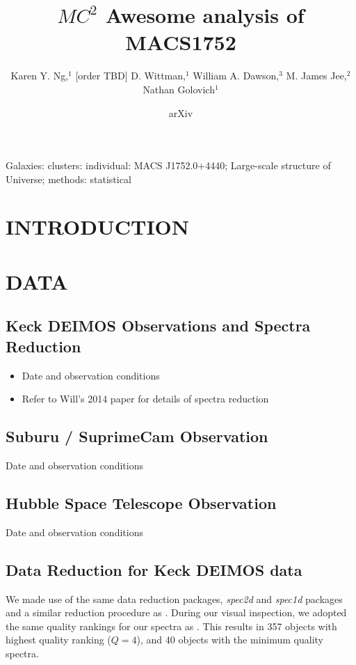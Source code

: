 \documentclass[letterpaper,useAMS,usenatbib]{mn2e}
\title[
	$MC^2$ Awesome analysis of MACS1752 
]
{$MC^2$ Awesome analysis of MACS1752}
\author[Karen Y. Ng et al.]{Karen Y. Ng,$^{1}$
	[order TBD]
	D. Wittman,$^{1}$
	William A. Dawson,$^{3}$ 
	M. James Jee,$^{2}$
	\newauthor Nathan Golovich$^{1}$
}
\begin{document}
\date{arXiv} \pagerange{\pageref{firstpage}--\pageref{lastpage}}
 \maketitle\label{firstpage}
\begin{abstract} 
	
\end{abstract}
\begin{keywords}
Galaxies: clusters: individual: MACS J1752.0+4440; Large-scale structure of
Universe; methods: statistical 
\end{keywords}
\section{INTRODUCTION} 
\section{DATA}
\subsection{Keck DEIMOS Observations and Spectra Reduction}
\begin{itemize}
	\item Date and observation conditions
	\item Refer to Will's 2014 paper for details of spectra reduction 
\end{itemize}

\subsection{Suburu / SuprimeCam Observation}
Date and observation conditions

\subsection{Hubble Space Telescope Observation} 
Date and observation conditions


\subsection{Data Reduction for Keck DEIMOS data}
We made use of the same data reduction packages, {\it spec2d}
and {\it spec1d} packages \citep{Newman2013} and a similar reduction procedure
as \cite{Dawson2015}. During our visual inspection,  we adopted the same 
quality rankings for our spectra as \cite{Newman2013}. This results in 
357 objects with highest quality ranking ($Q=4$), and 40 objects with the
minimum quality spectra.  
\end{document}
